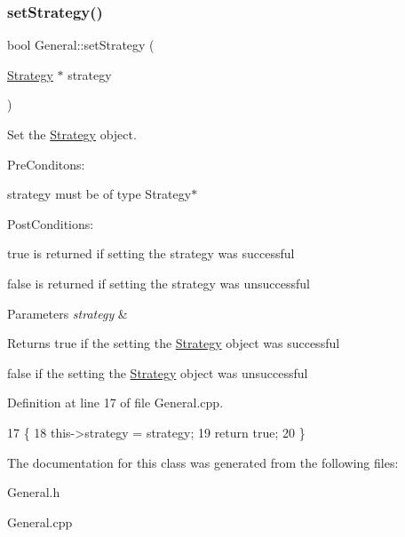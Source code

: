 \subsubsection{\texorpdfstring{set\+Strategy()}{setStrategy()}}
{\footnotesize\ttfamily bool General\+::set\+Strategy (\begin{DoxyParamCaption}\item[{\hyperlink{classStrategy}{Strategy} $\ast$}]{strategy }\end{DoxyParamCaption})}



Set the \hyperlink{classStrategy}{Strategy} object. 

Pre\+Conditons\+:
\begin{DoxyItemize}
\item strategy must be of type Strategy$\ast$
\end{DoxyItemize}

Post\+Conditions\+:
\begin{DoxyItemize}
\item true is returned if setting the strategy was successful
\item false is returned if setting the strategy was unsuccessful
\end{DoxyItemize}


\begin{DoxyParams}{Parameters}
{\em strategy} & \\
\hline
\end{DoxyParams}
\begin{DoxyReturn}{Returns}
true if the setting the \hyperlink{classStrategy}{Strategy} object was successful 

false if the setting the \hyperlink{classStrategy}{Strategy} object was unsuccessful 
\end{DoxyReturn}


Definition at line 17 of file General.\+cpp.


\begin{DoxyCode}
17                                            \{
18     this->strategy = strategy;
19     \textcolor{keywordflow}{return} \textcolor{keyword}{true};
20 \}
\end{DoxyCode}


The documentation for this class was generated from the following files\+:\begin{DoxyCompactItemize}
\item 
General.\+h\item 
General.\+cpp\end{DoxyCompactItemize}
